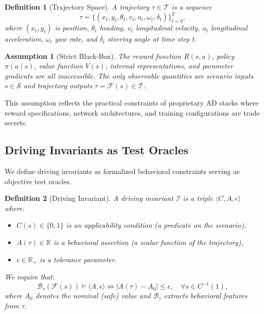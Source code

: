 \documentclass[journal]{IEEEtran}
\theoremstyle{plain}
\newtheorem{assumption}{Assumption}[section]
\newtheorem{definition}{Definition}[section]
\theoremstyle{definition}
\theoremstyle{remark}
\newcommand{\scenario}{\mathcal{S}}
\newcommand{\traj}{\mathcal{T}}
\newcommand{\sys}{\mathcal{F}}
\newcommand{\beh}{\mathcal{B}}
\newcommand{\R}{\mathbb{R}}
\begin{document}
\begin{definition}[Trajectory Space]
A trajectory $\tau \in \traj$ is a sequence
\begin{equation}
\tau = \{(x_t, y_t, \theta_t, v_t, a_t, \omega_t, \delta_t)\}_{t=0}^T,
\label{eq:trajectory}
\end{equation}
where $(x_t,y_t)$ is position, $\theta_t$ heading, $v_t$ longitudinal velocity, $a_t$ longitudinal acceleration, $\omega_t$ yaw rate, and $\delta_t$ steering angle at time step $t$.
\end{definition}

\begin{assumption}[Strict Black-Box]\label{assump:blackbox}
The reward function $R(s,a)$, policy $\pi(a \mid s)$, value function $V(s)$, internal representations, and parameter gradients are all inaccessible. The only observable quantities are scenario inputs $s \in \scenario$ and trajectory outputs $\tau = \sys(s) \in \traj$.
\end{assumption}

This assumption reflects the practical constraints of proprietary AD stacks where reward specifications, network architectures, and training configurations are trade secrets.

\subsection{Driving Invariants as Test Oracles}

We define driving invariants as formalized behavioral constraints serving as objective test oracles.

\begin{definition}[Driving Invariant]\label{inv:def}
A driving invariant $\mathcal{I}$ is a triple $\langle C, A, \epsilon \rangle$ where:
\begin{itemize}[nosep]
    \item $C(s) \in \{0,1\}$ is an applicability condition (a predicate on the scenario),
    \item $A(\tau) \in \R$ is a behavioral assertion (a scalar function of the trajectory),
    \item $\epsilon \in \R_+$ is a tolerance parameter.
\end{itemize}
We require that:
\begin{equation}
\beh_{\tau}(\sys(s)) \models \langle A, \epsilon \rangle \iff |A(\tau) - A_0| \leq \epsilon, \quad \forall s \in C^{-1}(1),
\label{eq:invariant}
\end{equation}
where $A_0$ denotes the nominal (safe) value and $\beh_{\tau}$ extracts behavioral features from $\tau$.
\end{definition}
\end{document}
